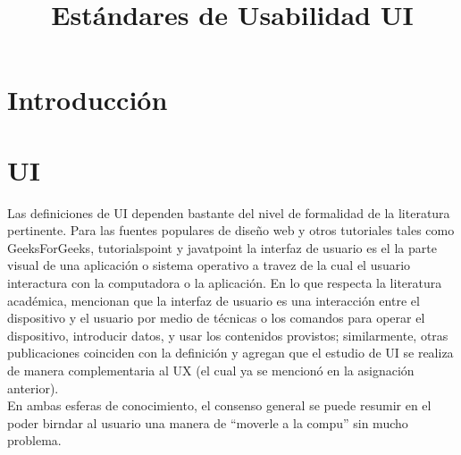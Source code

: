 \title{Estándares de Usabilidad UI}

\author{
}

\maketitle

\begin{abstract}

\end{abstract}

\section{Introducción}

\section{UI}
Las definiciones de UI dependen bastante del nivel de formalidad de la literatura
pertinente. Para las fuentes populares de diseño web y otros tutoriales tales como GeeksForGeeks, tutorialspoint y javatpoint \cite{tutorialspoint-2021,geeksforgeeks-2022,unknown-author-no-dateA} %
la interfaz de usuario es el la parte visual de una aplicación o sistema operativo a travez de la cual
el usuario interactura con la computadora o la aplicación. En lo que respecta la literatura
académica, \cite{sharma-2021} %
mencionan que la interfaz de usuario es una interacción entre
el dispositivo y el usuario por medio de técnicas o los comandos para operar el dispositivo,
introducir datos, y usar los contenidos provistos; similarmente, otras publicaciones
coinciden con la definición y agregan que el estudio de UI se realiza de manera complementaria al UX \cite{joo-2017,guntupalli-no-date}%
(el cual ya se mencionó en la asignación anterior).
\\

En ambas esferas de conocimiento, el consenso general se puede resumir en el poder birndar al usuario una
manera de ``moverle a la compu'' sin mucho problema.

